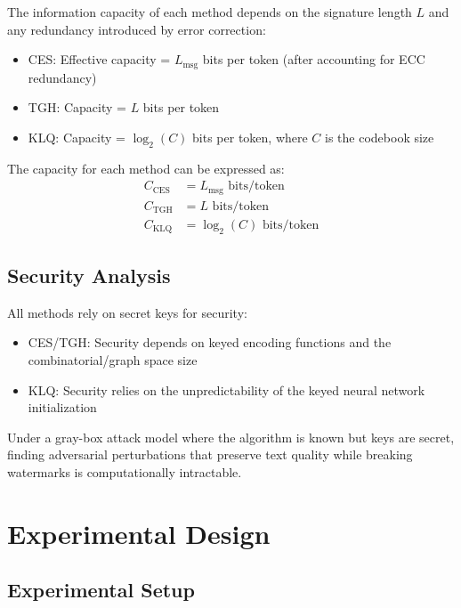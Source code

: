 The information capacity of each method depends on the signature length $L$ and any redundancy introduced by error correction:

\begin{itemize}
\item CES: Effective capacity = $L_{\text{msg}}$ bits per token (after accounting for ECC redundancy)
\item TGH: Capacity = $L$ bits per token  
\item KLQ: Capacity = $\log_2(C)$ bits per token, where $C$ is the codebook size
\end{itemize}

The capacity for each method can be expressed as:
\begin{align}
C_{\text{CES}} &= L_{\text{msg}} \text{ bits/token} \label{eq:ces_capacity} \\
C_{\text{TGH}} &= L \text{ bits/token} \label{eq:tgh_capacity} \\
C_{\text{KLQ}} &= \log_2(C) \text{ bits/token} \label{eq:klq_capacity}
\end{align}

\subsection{Security Analysis}

All methods rely on secret keys for security:
\begin{itemize}
\item CES/TGH: Security depends on keyed encoding functions and the combinatorial/graph space size
\item KLQ: Security relies on the unpredictability of the keyed neural network initialization
\end{itemize}

Under a gray-box attack model where the algorithm is known but keys are secret, finding adversarial perturbations that preserve text quality while breaking watermarks is computationally intractable.

\section{Experimental Design}

\subsection{Experimental Setup}

